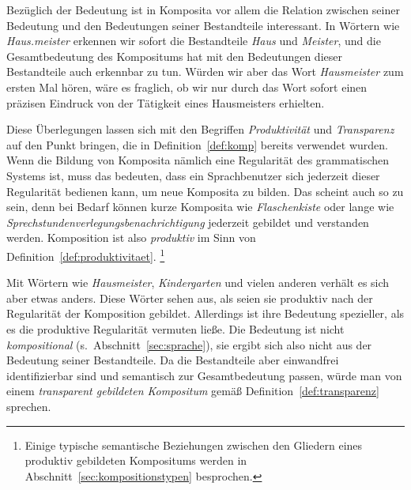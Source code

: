 Bezüglich der Bedeutung ist in Komposita vor allem die Relation zwischen seiner Bedeutung und den Bedeutungen seiner Bestandteile interessant.
In Wörtern wie \textit{Haus.meister} erkennen wir sofort die Bestandteile \textit{Haus} und \textit{Meister}, und die Gesamtbedeutung des Kompositums hat mit den Bedeutungen dieser Bestandteile auch erkennbar zu tun.
Würden wir aber das Wort \textit{Hausmeister} zum ersten Mal hören, wäre es fraglich, ob wir nur durch das Wort sofort einen präzisen Eindruck von der Tätigkeit eines Hausmeisters erhielten.

Diese Überlegungen lassen sich mit den Begriffen \textit{Produktivität} und \textit{Transparenz} auf den Punkt bringen, die in Definition~\ref{def:komp} bereits verwendet wurden.
Wenn die Bildung von Komposita nämlich eine Regularität des grammatischen Systems ist, muss das bedeuten, dass ein Sprachbenutzer sich jederzeit dieser Regularität bedienen kann, um neue Komposita zu bilden.
Das scheint auch so zu sein, denn bei Bedarf können kurze Komposita wie \textit{Flaschenkiste} oder lange wie \textit{Sprechstundenverlegungsbenachrichtigung} jederzeit gebildet und verstanden werden.
Komposition ist also \textit{produktiv} im Sinn von Definition~\ref{def:produktivitaet}.%
\footnote{Einige typische semantische Beziehungen zwischen den Gliedern eines produktiv gebildeten Kompositums werden in Abschnitt~\ref{sec:kompositionstypen} besprochen.}


Mit Wörtern wie \textit{Hausmeister}, \textit{Kindergarten} und vielen anderen verhält es sich aber etwas anders.
Diese Wörter sehen aus, als seien sie produktiv nach der Regularität der Komposition gebildet.
Allerdings ist ihre Bedeutung spezieller, als es die produktive Regularität vermuten ließe.
Die Bedeutung ist nicht \textit{kompositional} (s.\ Abschnitt~\ref{sec:sprache}), sie ergibt sich also nicht aus der Bedeutung seiner Bestandteile.
Da die Bestandteile aber einwandfrei identifizierbar sind und semantisch zur Gesamtbedeutung passen, würde man von einem \textit{transparent gebildeten Kompositum} gemäß Definition~\ref{def:transparenz} sprechen.


